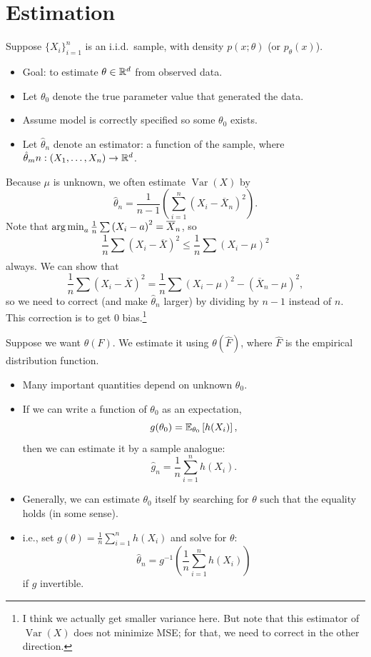 \section{Estimation}

\begin{remark}	Suppose $\{X_i\}_{i=1}^n$ is an i.i.d.\ sample, with density $p(x;\theta)$ (or $p_\theta(x)$).
	\begin{itemize}
		\item Goal: to estimate $\theta \in \mathbb{R}^d$ from observed data.
		\item Let $\theta_0$ denote the true parameter value that generated the data.
		\item Assume model is correctly specified so some $\theta_0$ exists.
		\item Let $\hat\theta_n$ denote an estimator: a function of the sample, where $\hat{\theta}_mn: \left( X_1,\ldots,X_n \right)\to \mathbb{R}^d$.
	\end{itemize}
\end{remark}

Because $\mu$ is unknown, we often estimate $\operatorname{Var}\left(X\right)$ by \[
	\hat{\theta}_n = \frac{1}{n-1} \left( \sum_{i=1}^{n} \left( X_i - \overline{X}_n \right)^2 \right)
.\] Note that $\operatorname*{arg\,min}_a \frac{1}{n}\sum \left( X_i - a \right)^2 = \overline{X}_n$, so \[
	\frac{1}{n} \sum_{}^{} (X_i - \overline{X})^2 \le \frac{1}{n} \sum_{}^{} \left( X_i - \mu \right)^2
\] always. We can show that \[
	\frac{1}{n}\sum \left( X_i - \overline{X} \right)^2 = \frac{1}{n} \sum \left( X_i - \mu \right)^2 - \left( \overline{X}_n - \mu \right)^2
,\] so we need to correct (and make $\hat{\theta}_n$ larger) by dividing by $n-1$ instead of $n$. This correction is to get $0$ bias.\footnote{I think we actually get smaller variance here. But note that this estimator of $\operatorname{Var}\left(X\right)$ does not minimize MSE; for that, we need to correct in the other direction.}

\begin{remark}
	Suppose we want $\theta(F)$. We estimate it using $\theta(\hat{F})$, where $\hat{F}$ is the empirical distribution function. 
	\begin{itemize}
		\item Many important quantities depend on unknown $\theta_0$.
		\item If we can write a function of $\theta_0$ as an expectation,
		      \[
			      g(\theta_0)=\mathbb{E}_{\theta_0}\left[h(X_i)\right],
		      \]
		      then we can estimate it by a sample analogue:
		      \[
			      \hat g_n=\frac{1}{n}\sum_{i=1}^n h(X_i).
		      \]
		\item Generally, we can estimate $\theta_0$ itself by searching for $\theta$ such that the equality holds (in some sense).
		\item i.e., set $g(\theta)=\frac{1}{n}\sum_{i=1}^n h(X_i)$ and solve for $\theta$:
		      \[
			      \hat\theta_n=g^{-1}\left(\frac{1}{n}\sum_{i=1}^n h(X_i)\right)
		      \]
		      if $g$ invertible.
	\end{itemize}
\end{remark}

